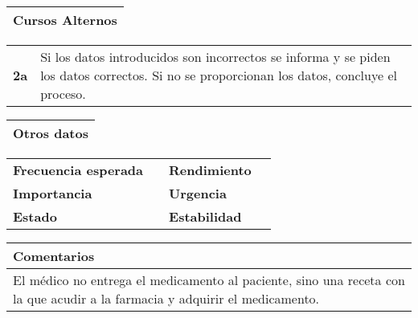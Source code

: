\documentclass[11pt,a4paper]{article}
\begin{document}
\begin{table}[H]
	\begin{tabularx}{\textwidth}{X}
		\textbf{Cursos Alternos}\\ \hline
	\end{tabularx}
	\begin{tabularx}{\textwidth}{cX}
		\textbf{2a} & Si los datos introducidos son incorrectos se informa y se piden los datos correctos. Si no se proporcionan los datos, concluye el proceso. \\
	\end{tabularx}
\end{table}

\begin{table}[H]
	\begin{tabularx}{\textwidth}{X}
		\textbf{Otros datos}\\ \hline
	\end{tabularx}
	\begin{tabularx}{\textwidth}{lXlX}
		\textbf{Frecuencia esperada} &  & \textbf{Rendimiento} & \\
		\textbf{Importancia} & & \textbf{Urgencia} & \\
		\textbf{Estado} &  & \textbf{Estabilidad} & \\
	\end{tabularx}
	
	\bigskip
	
	\begin{tabularx}{\textwidth}{X}
		\textbf{Comentarios}\\ \hline
		El médico no entrega el medicamento al paciente, sino una receta con la que acudir a la farmacia y adquirir el medicamento. \\
	\end{tabularx}
\end{table}

\newpage




\end{document}
